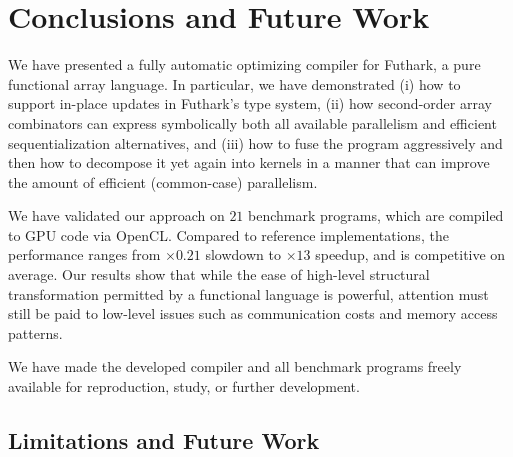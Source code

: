 \chapter{Conclusions and Future Work}
\label{chap:conclusions}

We have presented a fully automatic optimizing compiler for Futhark, a
pure functional array language.  In particular, we have demonstrated
(i) how to support in-place updates in Futhark's type system, (ii) how
second-order array combinators can express symbolically both all
available parallelism and efficient sequentialization alternatives,
and (iii) how to fuse the program aggressively and then how to
decompose it yet again into kernels in a manner that can improve the
amount of efficient (common-case) parallelism.

We have validated our approach on $21$ benchmark programs, which are
compiled to GPU code via OpenCL. Compared to reference
implementations, the performance ranges from $\times0.21$ slowdown to
$\times13$ speedup, and is competitive on average.
%
Our results show that while the ease of high-level structural
transformation permitted by a functional language is powerful,
attention must still be paid to low-level issues such as communication
costs and memory access patterns.

We have made the developed compiler and all benchmark programs freely
available for reproduction, study, or further development.

\section{Limitations and Future Work}

